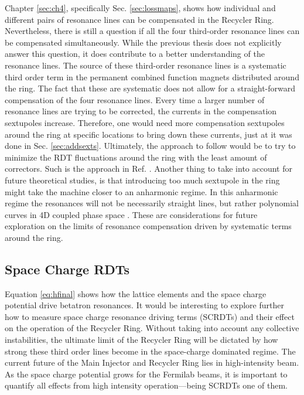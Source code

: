 Chapter \ref{sec:ch4}, specifically Sec. \ref{sec:lossmaps}, shows how individual and different pairs of resonance lines can be compensated in the Recycler Ring. Nevertheless, there is still a question if all the four third-order resonance lines can be compensated simultaneously. While the previous thesis does not explicitly answer this question, it does contribute to a better understanding of the resonance lines. The source of these third-order resonance lines is a systematic third order term in the permanent combined function magnets distributed around the ring. The fact that these are systematic does not allow for a straight-forward compensation of the four resonance lines. Every time a larger number of resonance lines are trying to be corrected, the currents in the compensation sextupoles increase. Therefore, one would need more compensation sextupoles around the ring at specific locations to bring down these currents, just at it was done in Sec. \ref{sec:addsexts}. Ultimately, the approach to follow would be to try to minimize the RDT fluctuations around the ring with the least amount of correctors. Such is the approach in Ref. \cite{rdtfluct}. Another thing to take into account for future theoretical studies, is that introducing too much sextupole in the ring might take the machine closer to an anharmonic regime. In this anharmonic regime the resonances will not be necessarily straight lines, but rather polynomial curves in 4D coupled phase space \cite{fixedlines1,fixedlines2}.  These are considerations for future exploration on the limits of resonance compensation driven by systematic terms around the ring.  

\subsection{Space Charge RDTs}

Equation \ref{eq:hfinal} shows how the lattice elements and the space charge potential drive betatron resonances. It would be interesting to explore further how to measure space charge resonance driving terms (SCRDTs) and their effect on the operation of the Recycler Ring. Without taking into account any collective instabilities, the ultimate limit of the Recycler Ring will be dictated by how strong these third order lines become in the space-charge dominated regime. The current future of the Main Injector and Recycler Ring lies in high-intensity beam. As the space charge potential grows for the Fermilab beams, it is important to quantify all effects from high intensity operation---being SCRDTs one of them.
